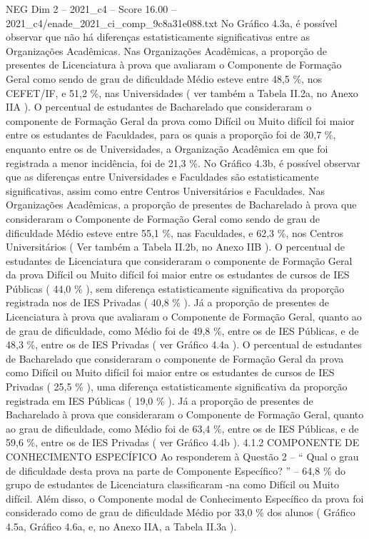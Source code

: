 \begin{textsample}{NEG Dim 2 – 2021\_c4 – Score 16.00 – 2021\_c4/enade\_2021\_ci\_comp\_9c8a31e088.txt}
No Gráfico 4.3a, é possível observar que não há diferenças estatisticamente significativas entre as Organizações Acadêmicas.
Nas Organizações Acadêmicas, a proporção de presentes de Licenciatura à prova que avaliaram o Componente de Formação Geral como sendo de grau de dificuldade Médio esteve entre 48,5 \%, nos CEFET/IF, e 51,2 \%, nas Universidades ( ver também a Tabela II.2a, no Anexo IIA ).
O percentual de estudantes de Bacharelado que consideraram o componente de Formação Geral da prova como Difícil ou Muito difícil foi maior entre os estudantes de Faculdades, para os quais a proporção foi de 30,7 \%, enquanto entre os de Universidades, a Organização Acadêmica em que foi registrada a menor incidência, foi de 21,3 \%.
No Gráfico 4.3b, é possível observar que as diferenças entre Universidades e Faculdades são estatisticamente significativas, assim como entre Centros Universitários e Faculdades.
Nas Organizações Acadêmicas, a proporção de presentes de Bacharelado à prova que consideraram o Componente de Formação Geral como sendo de grau de dificuldade Médio esteve entre 55,1 \%, nas Faculdades, e 62,3 \%, nos Centros Universitários ( Ver também a Tabela II.2b, no Anexo IIB ).
O percentual de estudantes de Licenciatura que consideraram o componente de Formação Geral da prova Difícil ou Muito difícil foi maior entre os estudantes de cursos de IES Públicas ( 44,0 \% ), sem diferença estatisticamente significativa da proporção registrada nos de IES Privadas ( 40,8 \% ).
Já a proporção de presentes de Licenciatura à prova que avaliaram o Componente de Formação Geral, quanto ao de grau de dificuldade, como Médio foi de 49,8 \%, entre os de IES Públicas, e de 48,3 \%, entre os de IES Privadas ( ver Gráfico 4.4a ).
O percentual de estudantes de Bacharelado que consideraram o componente de Formação Geral da prova como Difícil ou Muito difícil foi maior entre os estudantes de cursos de IES Privadas ( 25,5 \% ), uma diferença estatisticamente significativa da proporção registrada em IES Públicas ( 19,0 \% ).
Já a proporção de presentes de Bacharelado à prova que consideraram o Componente de Formação Geral, quanto ao grau de dificuldade, como Médio foi de 63,4 \%, entre os de IES Públicas, e de 59,6 \%, entre os de IES Privadas ( ver Gráfico 4.4b ). 4.1.2 COMPONENTE DE CONHECIMENTO ESPECÍFICO Ao responderem à Questão 2 – “ Qual o grau de dificuldade desta prova na parte de Componente Específico? ” – 64,8 \% do grupo de estudantes de Licenciatura classificaram -na como Difícil ou Muito difícil.
Além disso, o Componente modal de Conhecimento Específico da prova foi considerado como de grau de dificuldade Médio por 33,0 \% dos alunos ( Gráfico 4.5a, Gráfico 4.6a, e, no Anexo IIA, a Tabela II.3a ).

\end{textsample}
